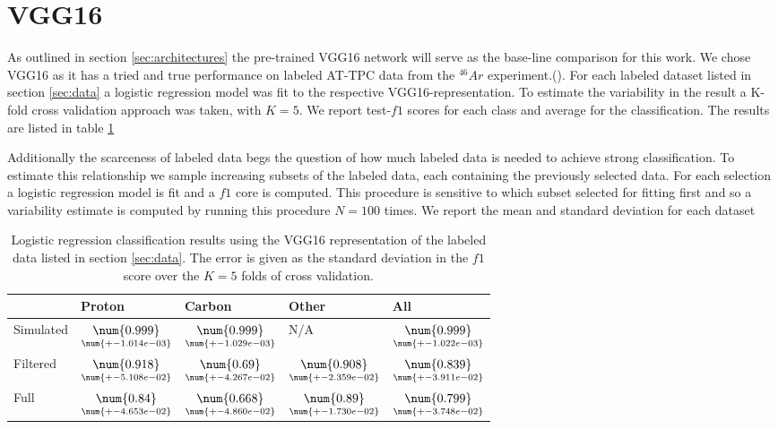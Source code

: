 \section{VGG16}

As outlined in section \ref{sec:architectures} the pre-trained VGG16 network will serve as the base-line comparison for this work. We chose VGG16 as it has a tried and true performance on labeled AT-TPC data from the $^{46}Ar$ experiment.(\cite{Kuchera2019}). For each labeled dataset listed in section \ref{sec:data} a logistic regression model was fit to the respective VGG16-representation. To estimate the variability in the result a K-fold cross validation approach was taken, with $K=5$. We report test-$f1$ scores for each class and average for the classification. The results are listed in table \ref{tab:vgg_results}

Additionally the scarceness of labeled data begs the question of how much labeled data is needed to achieve strong classification. To estimate this relationship we sample increasing subsets of the labeled data, each containing the previously selected data. For each selection a logistic regression model is fit and a $f1$ core is computed. This procedure is sensitive to which subset selected for fitting first and so a variability estimate is computed by running this procedure $N=100$ times. We report the mean and standard deviation for each dataset 


\begin{table}
\centering
\begin{tabular}{lllll}
\toprule
{} & Proton & Carbon & Other & All \\
\midrule
Simulated &  $\underset{\num{+- 1.014e-03 }  }{\num{ 0.999 } }$ &  $\underset{\num{+- 1.029e-03 }  }{\num{ 0.999 } }$ &  N/A &  $\underset{\num{+- 1.022e-03 }  }{\num{ 0.999 } }$ \\
Filtered  &  $\underset{\num{+- 5.108e-02 }  }{\num{ 0.918 } }$ &  $\underset{\num{+- 4.267e-02 }  }{\num{ 0.69 } }$ &  $\underset{\num{+- 2.359e-02 }  }{\num{ 0.908 } }$ &  $\underset{\num{+- 3.911e-02 }  }{\num{ 0.839 } }$ \\
Full      &  $\underset{\num{+- 4.653e-02 }  }{\num{ 0.84 } }$ &  $\underset{\num{+- 4.860e-02 }  }{\num{ 0.668 } }$ &  $\underset{\num{+- 1.730e-02 }  }{\num{ 0.89 } }$ &  $\underset{\num{+- 3.748e-02 }  }{\num{ 0.799 } }$ \\
\bottomrule
\end{tabular}
\caption[VGG classification results]{Logistic regression classification results using the VGG16 representation of the labeled data listed in section \ref{sec:data}. The error is given as the standard deviation in the $f1$ score over the $K=5$ folds of cross validation.}\label{tab:vgg_results}
\end{table}
